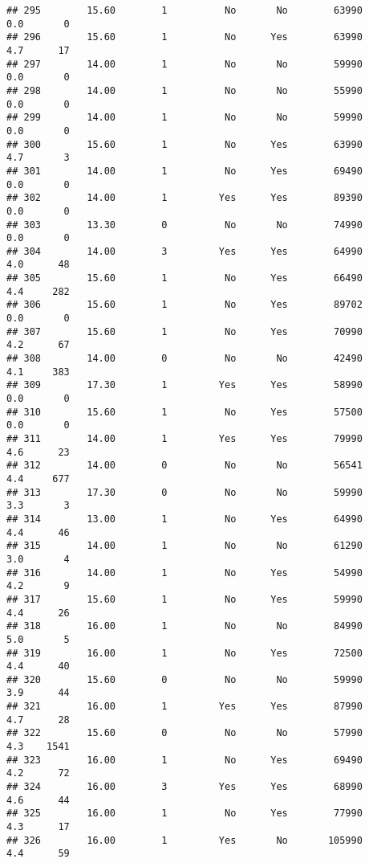 \documentclass[
]{article}
\begin{document}
\begin{verbatim}
## 295        15.60        1          No       No        63990         0.0       0
## 296        15.60        1          No      Yes        63990         4.7      17
## 297        14.00        1          No       No        59990         0.0       0
## 298        14.00        1          No       No        55990         0.0       0
## 299        14.00        1          No       No        59990         0.0       0
## 300        15.60        1          No      Yes        63990         4.7       3
## 301        14.00        1          No      Yes        69490         0.0       0
## 302        14.00        1         Yes      Yes        89390         0.0       0
## 303        13.30        0          No       No        74990         0.0       0
## 304        14.00        3         Yes      Yes        64990         4.0      48
## 305        15.60        1          No      Yes        66490         4.4     282
## 306        15.60        1          No      Yes        89702         0.0       0
## 307        15.60        1          No      Yes        70990         4.2      67
## 308        14.00        0          No       No        42490         4.1     383
## 309        17.30        1         Yes      Yes        58990         0.0       0
## 310        15.60        1          No      Yes        57500         0.0       0
## 311        14.00        1         Yes      Yes        79990         4.6      23
## 312        14.00        0          No       No        56541         4.4     677
## 313        17.30        0          No       No        59990         3.3       3
## 314        13.00        1          No      Yes        64990         4.4      46
## 315        14.00        1          No       No        61290         3.0       4
## 316        14.00        1          No      Yes        54990         4.2       9
## 317        15.60        1          No      Yes        59990         4.4      26
## 318        16.00        1          No       No        84990         5.0       5
## 319        16.00        1          No      Yes        72500         4.4      40
## 320        15.60        0          No       No        59990         3.9      44
## 321        16.00        1         Yes      Yes        87990         4.7      28
## 322        15.60        0          No       No        57990         4.3    1541
## 323        16.00        1          No      Yes        69490         4.2      72
## 324        16.00        3         Yes      Yes        68990         4.6      44
## 325        16.00        1          No      Yes        77990         4.3      17
## 326        16.00        1         Yes       No       105990         4.4      59

\end{verbatim}
\end{document}
